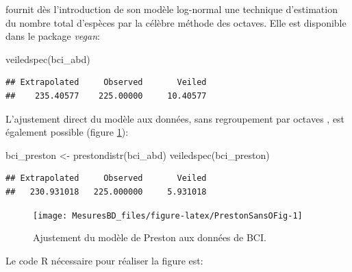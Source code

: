 \documentclass[
  11pt,
  american,
  a4paper,
  extrafontsizes,onecolumn,openright
  ]{memoir}
\newenvironment{Shaded}{\begin{snugshade}}{\end{snugshade}}
\newcommand{\FunctionTok}[1]{\textcolor[rgb]{0.00,0.00,0.00}{#1}}
\newcommand{\NormalTok}[1]{#1}
\newcommand{\OtherTok}[1]{\textcolor[rgb]{0.56,0.35,0.01}{#1}}
\begin{document}
\textcite{Preston1948} fournit dès l'introduction de son modèle log-normal une technique d'estimation du nombre total d'espèces par la célèbre méthode des octaves.
Elle est disponible dans le package \emph{vegan}:

\scriptsize

\begin{Shaded}
\begin{Highlighting}[]
\FunctionTok{veiledspec}\NormalTok{(bci\_abd)}
\end{Highlighting}
\end{Shaded}

\begin{verbatim}
## Extrapolated     Observed       Veiled 
##    235.40577    225.00000     10.40577
\end{verbatim}

\normalsize

L'ajustement direct du modèle aux données, sans regroupement par octaves \autocite{Williamson2005}, est également possible (figure \ref{fig:PrestonSansOFig}):

\scriptsize

\begin{Shaded}
\begin{Highlighting}[]
\NormalTok{bci\_preston }\OtherTok{\textless{}{-}} \FunctionTok{prestondistr}\NormalTok{(bci\_abd)}
\FunctionTok{veiledspec}\NormalTok{(bci\_preston)}
\end{Highlighting}
\end{Shaded}

\begin{verbatim}
## Extrapolated     Observed       Veiled 
##   230.931018   225.000000     5.931018
\end{verbatim}

\normalsize



\scriptsize

\begin{figure}

{\centering \texttt{[image: MesuresBD\_files/figure-latex/PrestonSansOFig-1]} 

}

\caption{Ajustement du modèle de Preston aux données de BCI.}\label{fig:PrestonSansOFig}
\end{figure}

\normalsize

Le code R nécessaire pour réaliser la figure est:

\scriptsize
\end{document}
